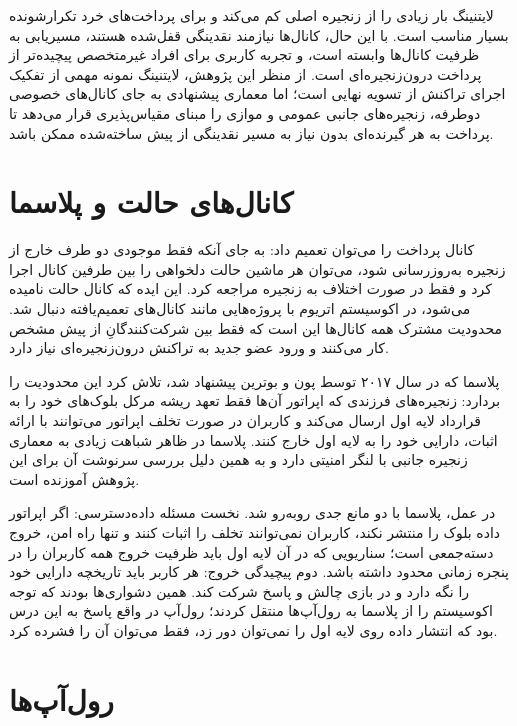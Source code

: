 لایتنینگ بار زیادی را از زنجیره اصلی کم می‌کند و برای پرداخت‌های خرد تکرارشونده بسیار مناسب است. با این حال، کانال‌ها نیازمند نقدینگی قفل‌شده هستند، مسیریابی به ظرفیت کانال‌ها وابسته است، و تجربه کاربری برای افراد غیرمتخصص پیچیده‌تر از پرداخت درون‌زنجیره‌ای است. از منظر این پژوهش، لایتنینگ نمونه مهمی از تفکیک اجرای تراکنش از تسویه نهایی است؛ اما معماری پیشنهادی به جای کانال‌های خصوصی دوطرفه، زنجیره‌های جانبی عمومی و موازی را مبنای مقیاس‌پذیری قرار می‌دهد تا پرداخت به هر گیرنده‌ای بدون نیاز به مسیر نقدینگی از پیش ساخته‌شده ممکن باشد.

\section{کانال‌های حالت و پلاسما}

کانال پرداخت را می‌توان تعمیم داد: به جای آنکه فقط موجودی دو طرف خارج از زنجیره به‌روزرسانی شود، می‌توان هر ماشین حالت دلخواهی را بین طرفین کانال اجرا کرد و فقط در صورت اختلاف به زنجیره مراجعه کرد. این ایده که کانال حالت نامیده می‌شود، در اکوسیستم اتریوم با پروژه‌هایی مانند کانال‌های تعمیم‌یافته دنبال شد. محدودیت مشترک همه کانال‌ها این است که فقط بین شرکت‌کنندگانِ از پیش مشخص کار می‌کنند و ورود عضو جدید به تراکنش درون‌زنجیره‌ای نیاز دارد.

پلاسما که در سال ۲۰۱۷ توسط پون و بوترین پیشنهاد شد، تلاش کرد این محدودیت را بردارد: زنجیره‌های فرزندی که اپراتور آن‌ها فقط تعهد ریشه مرکل بلوک‌های خود را به قرارداد لایه اول ارسال می‌کند و کاربران در صورت تخلف اپراتور می‌توانند با ارائه اثبات، دارایی خود را به لایه اول خارج کنند. پلاسما در ظاهر شباهت زیادی به معماری زنجیره جانبی با لنگر امنیتی دارد و به همین دلیل بررسی سرنوشت آن برای این پژوهش آموزنده است.

در عمل، پلاسما با دو مانع جدی روبه‌رو شد. نخست مسئله داده‌دسترسی: اگر اپراتور داده بلوک را منتشر نکند، کاربران نمی‌توانند تخلف را اثبات کنند و تنها راه امن، خروج دسته‌جمعی است؛ سناریویی که در آن لایه اول باید ظرفیت خروج همه کاربران را در پنجره زمانی محدود داشته باشد. دوم پیچیدگی خروج: هر کاربر باید تاریخچه دارایی خود را نگه دارد و در بازی چالش و پاسخ شرکت کند. همین دشواری‌ها بودند که توجه اکوسیستم را از پلاسما به رول‌آپ‌ها منتقل کردند؛ رول‌آپ در واقع پاسخ به این درس بود که انتشار داده روی لایه اول را نمی‌توان دور زد، فقط می‌توان آن را فشرده کرد.

\section{رول‌آپ‌ها}

